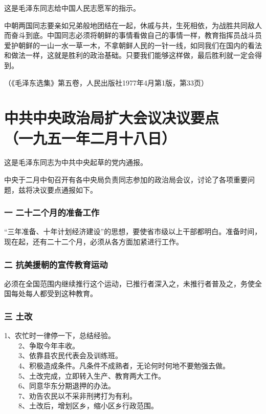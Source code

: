 \documentclass[cn,11pt,chinese]{elegantbook}
\def\myformat#1{\hfil\hfil #1}
\begin{document}
\begin{introduction}\item  这是毛泽东同志给中国人民志愿军的指示。\end{introduction}
中朝两国同志要亲如兄弟般地团结在一起，休戚与共，生死相依，为战胜共同敌人而奋斗到底。中国同志必须将朝鲜的事情看做自己的事情一样，教育指挥员战斗员爱护朝鲜的一山一水一草一木，不拿朝鲜人民的一针一线，如同我们在国内的看法和做法一样，这就是胜利的政治基础。只要我们能够这样做，最后胜利就一定会得到。\\
\begin{flushright}（《毛泽东选集》第五卷，人民出版社1977年4月第1版，第33页）\end{flushright}
\newpage\section*{\myformat{中共中央政治局扩大会议决议要点}\\\myformat{（一九五一年二月十八日）}}
\begin{introduction}\item  这是毛泽东同志为中共中央起草的党内通报。\end{introduction}
中央于二月中旬召开有各中央局负责同志参加的政治局会议，讨论了各项重要问题，兹将决议要点通报如下。\\
\subsubsection*{\myformat{一 二十二个月的准备工作}}
“三年准备、十年计划经济建设”的思想，要使省市级以上干部都明白。准备时间，现在起，还有二十二个月，必须从各方面加紧进行工作。\\
\subsubsection*{\myformat{二 抗美援朝的宣传教育运动}}
必须在全国范围内继续推行这个运动，已推行者深入之，未推行者普及之，务使全国每处每人都受到这种教育。\\
\subsubsection*{\myformat{三 土改}}
1、农忙时一律停一下，总结经验。\\
　　2、争取今年丰收。\\
　　3、依靠县农民代表会及训练班。\\
　　4、积极造成条件。凡条件不成熟者，无论何时何地不要勉强去做。\\
　　5、土改完成，立即转入生产、教育两大工作。\\
　　6、同意华东分期退押的办法。\\
　　7、劝告农民以不采非刑拷打为有利。\\
　　8、土改后，增划区乡，缩小区乡行政范围。\\
\end{document}
